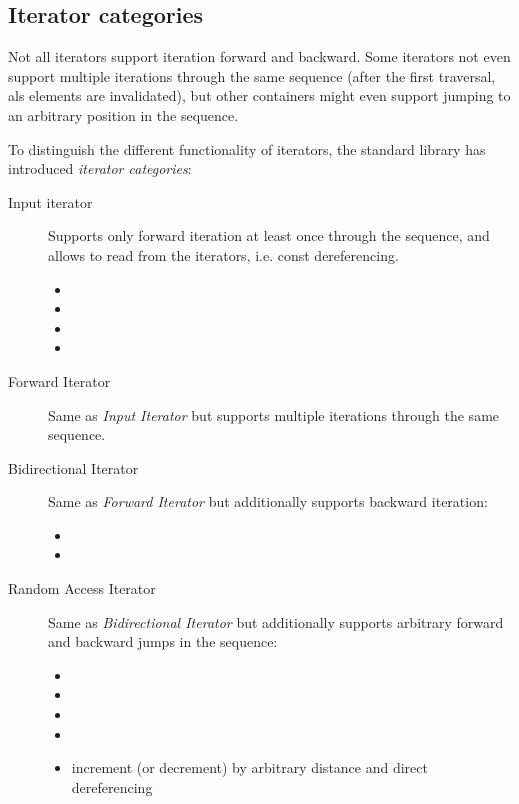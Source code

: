 \subsection{Iterator categories}
Not all iterators support iteration forward and backward. Some iterators not even support multiple iterations through the same sequence
(after the first traversal, als elements are invalidated), but other containers might even support jumping to an arbitrary position in the
sequence.

To distinguish the different functionality of iterators, the standard library has introduced \emph{iterator categories}:
\begin{description}
  \item[Input iterator]
    Supports only forward iteration at least once through the sequence, and allows to read from the iterators, i.e. const dereferencing.
    \begin{itemize}
      \item {}
      \item {}
      \item {}
      \item {}
    \end{itemize}
  \item[Forward Iterator]
    Same as \emph{Input Iterator} but supports multiple iterations through the same sequence.
  \item[Bidirectional Iterator]
    Same as \emph{Forward Iterator} but additionally supports backward iteration:
    \begin{itemize}
      \item {}
      \item {}
    \end{itemize}
  \item[Random Access Iterator]
    Same as \emph{Bidirectional Iterator} but additionally supports arbitrary forward and backward jumps in the sequence:
    \begin{itemize}
      \item {}
      \item {}
      \item {}
      \item {}
      \item {} increment (or decrement) by arbitrary distance and direct dereferencing

\end{itemize}
\end{description}
